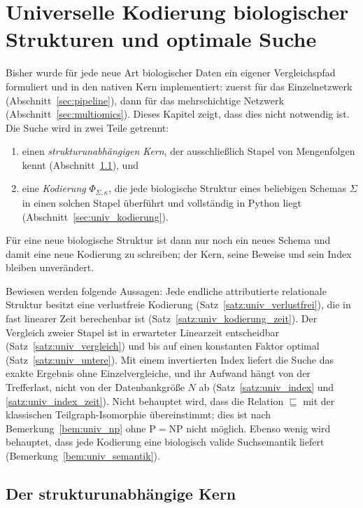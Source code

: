 \section{Universelle Kodierung biologischer Strukturen und optimale Suche}
\label{sec:universell}

Bisher wurde für jede neue Art biologischer Daten ein eigener Vergleichspfad formuliert und in den nativen Kern implementiert: zuerst für das Einzelnetzwerk (Abschnitt~\ref{sec:pipeline}), dann für das mehrschichtige Netzwerk (Abschnitt~\ref{sec:multiomics}). Dieses Kapitel zeigt, dass dies nicht notwendig ist. Die Suche wird in zwei Teile getrennt:
\begin{enumerate}[label=(\roman*)]
\item einen \emph{strukturunabhängigen Kern}, der ausschließlich Stapel von Mengenfolgen kennt (Abschnitt~\ref{sec:univ_kern}), und
\item eine \emph{Kodierung} $\Phi_{\Sigma,\kappa}$, die jede biologische Struktur eines beliebigen Schemas $\Sigma$ in einen solchen Stapel überführt und vollständig in Python liegt (Abschnitt~\ref{sec:univ_kodierung}).
\end{enumerate}
Für eine neue biologische Struktur ist dann nur noch ein neues Schema und damit eine neue Kodierung zu schreiben; der Kern, seine Beweise und sein Index bleiben unverändert.

Bewiesen werden folgende Aussagen: Jede endliche attributierte relationale Struktur besitzt eine verlustfreie Kodierung (Satz~\ref{satz:univ_verlustfrei}), die in fast linearer Zeit berechenbar ist (Satz~\ref{satz:univ_kodierung_zeit}). Der Vergleich zweier Stapel ist in erwarteter Linearzeit entscheidbar (Satz~\ref{satz:univ_vergleich}) und bis auf einen konstanten Faktor optimal (Satz~\ref{satz:univ_untere}). Mit einem invertierten Index liefert die Suche das exakte Ergebnis ohne Einzelvergleiche, und ihr Aufwand hängt von der Trefferlast, nicht von der Datenbankgröße $N$ ab (Satz~\ref{satz:univ_index} und \ref{satz:univ_index_zeit}). Nicht behauptet wird, dass die Relation $\sqsubseteq$ mit der klassischen Teilgraph-Isomorphie übereinstimmt; dies ist nach Bemerkung~\ref{bem:univ_np} ohne $\mathrm{P}=\mathrm{NP}$ nicht möglich. Ebenso wenig wird behauptet, dass jede Kodierung eine biologisch valide Suchsemantik liefert (Bemerkung~\ref{bem:univ_semantik}).

\subsection{Der strukturunabhängige Kern}
\label{sec:univ_kern}

